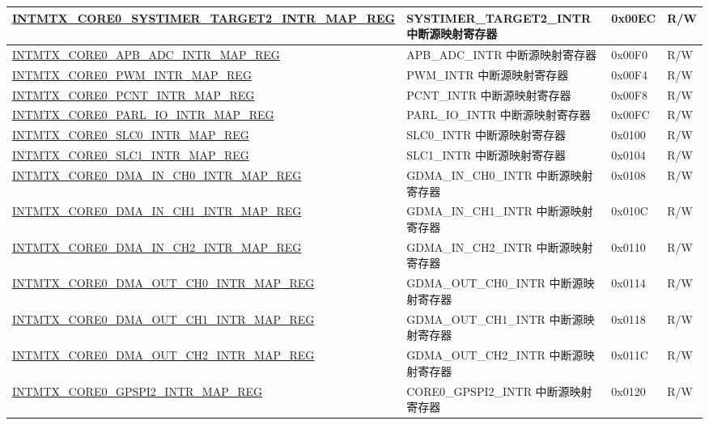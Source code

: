 \begin{longtable}{ | p{10cm} | m{10cm} | m{1.3cm} | m{1.0cm} | }
\hyperref[regdesc:INTMTXCORE0SYSTIMERTARGET2INTRMAPREG]{INTMTX\_CORE0\_SYSTIMER\_TARGET2\_INTR\_MAP\_REG} & SYSTIMER\_TARGET2\_INTR 中断源映射寄存器 & 0x00EC & R/W \\ \hline
\hyperref[regdesc:INTMTXCORE0APBADCINTRMAPREG]{INTMTX\_CORE0\_APB\_ADC\_INTR\_MAP\_REG} & APB\_ADC\_INTR 中断源映射寄存器 & 0x00F0 & R/W \\ \hline
\hyperref[regdesc:INTMTXCORE0PWMINTRMAPREG]{INTMTX\_CORE0\_PWM\_INTR\_MAP\_REG} & PWM\_INTR 中断源映射寄存器 & 0x00F4 & R/W \\ \hline
\hyperref[regdesc:INTMTXCORE0PCNTINTRMAPREG]{INTMTX\_CORE0\_PCNT\_INTR\_MAP\_REG} & PCNT\_INTR 中断源映射寄存器 & 0x00F8 & R/W \\ \hline
\hyperref[regdesc:INTMTXCORE0PARLIOINTRMAPREG]{INTMTX\_CORE0\_PARL\_IO\_INTR\_MAP\_REG} & PARL\_IO\_INTR 中断源映射寄存器 & 0x00FC & R/W \\ \hline
\hyperref[regdesc:INTMTXCORE0SLC0INTRMAPREG]{INTMTX\_CORE0\_SLC0\_INTR\_MAP\_REG} & SLC0\_INTR 中断源映射寄存器 & 0x0100 & R/W \\ \hline
\hyperref[regdesc:INTMTXCORE0SLC1INTRMAPREG]{INTMTX\_CORE0\_SLC1\_INTR\_MAP\_REG} & SLC1\_INTR 中断源映射寄存器 & 0x0104 & R/W \\ \hline
\hyperref[regdesc:INTMTXCORE0DMAINCH0INTRMAPREG]{INTMTX\_CORE0\_DMA\_IN\_CH0\_INTR\_MAP\_REG} & GDMA\_IN\_CH0\_INTR 中断源映射寄存器 & 0x0108 & R/W \\ \hline
\hyperref[regdesc:INTMTXCORE0DMAINCH1INTRMAPREG]{INTMTX\_CORE0\_DMA\_IN\_CH1\_INTR\_MAP\_REG} & GDMA\_IN\_CH1\_INTR 中断源映射寄存器 & 0x010C & R/W \\ \hline
\hyperref[regdesc:INTMTXCORE0DMAINCH2INTRMAPREG]{INTMTX\_CORE0\_DMA\_IN\_CH2\_INTR\_MAP\_REG} & GDMA\_IN\_CH2\_INTR 中断源映射寄存器 & 0x0110 & R/W \\ \hline
\hyperref[regdesc:INTMTXCORE0DMAOUTCH0INTRMAPREG]{INTMTX\_CORE0\_DMA\_OUT\_CH0\_INTR\_MAP\_REG} & GDMA\_OUT\_CH0\_INTR 中断源映射寄存器 & 0x0114 & R/W \\ \hline
\hyperref[regdesc:INTMTXCORE0DMAOUTCH1INTRMAPREG]{INTMTX\_CORE0\_DMA\_OUT\_CH1\_INTR\_MAP\_REG} & GDMA\_OUT\_CH1\_INTR 中断源映射寄存器 & 0x0118 & R/W \\ \hline
\hyperref[regdesc:INTMTXCORE0DMAOUTCH2INTRMAPREG]{INTMTX\_CORE0\_DMA\_OUT\_CH2\_INTR\_MAP\_REG} & GDMA\_OUT\_CH2\_INTR 中断源映射寄存器 & 0x011C & R/W \\ \hline
\hyperref[regdesc:INTMTXCORE0GPSPI2INTRMAPREG]{INTMTX\_CORE0\_GPSPI2\_INTR\_MAP\_REG} & CORE0\_GPSPI2\_INTR 中断源映射寄存器 & 0x0120 & R/W \\ \hline

\end{longtable}

